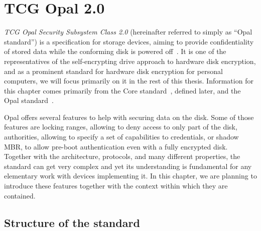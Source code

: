 \chapter{TCG Opal 2.0}
\label{chapter_opal}

\emph{TCG Opal Security Subsystem Class 2.0} (hereinafter referred to simply as ``Opal standard'') is a specification for storage devices, aiming to provide confidentiality of stored data while the conforming disk is powered off~\cite{tcg-opal2}. It is one of the representatives of the self-encrypting drive approach to hardware disk encryption, and as a prominent standard for hardware disk encryption for personal computers, we will focus primarily on it in the rest of this thesis.
Information for this chapter comes primarily from the Core standard~\cite{tcg-storage-core}, defined later, and the Opal standard~\cite{tcg-opal2}.

Opal offers several features to help with securing data on the disk.
Some of those features are locking ranges, allowing to deny access to only part of the disk, authorities, allowing to specify a set of capabilities to credentials, or shadow MBR, to allow pre-boot authentication even with a fully encrypted disk. Together with the architecture, protocols, and many different properties, the standard can get very complex and yet its understanding is fundamental for any elementary work with devices implementing it.
In this chapter, we are planning to introduce these features together with the context within which they are contained.



\section{Structure of the standard}


